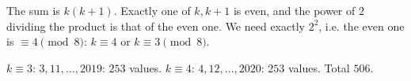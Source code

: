 The sum is $k(k+1)$. Exactly one of $k,k+1$ is even, and the power of $2$ dividing the product is that of the even one. We need exactly $2^2$, i.e. the even one is $\equiv4\pmod8$: $k\equiv4$ or $k\equiv3\pmod 8$.

$k\equiv3$: $3,11,\dots,2019$: $253$ values. $k\equiv4$: $4,12,\dots,2020$: $253$ values. Total $\boxed{506}$.
